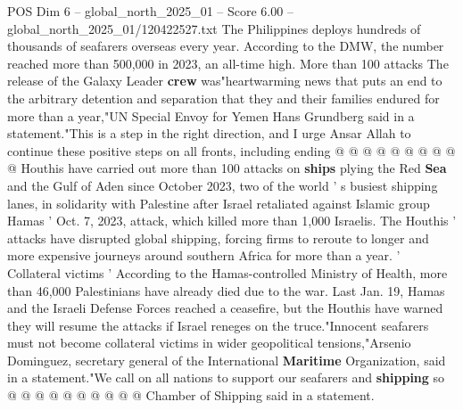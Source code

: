 \begin{textsample}{POS Dim 6 – global\_north\_2025\_01 – Score 6.00 – global\_north\_2025\_01/120422527.txt}
The Philippines deploys hundreds of thousands of seafarers overseas every year.
According to the DMW, the number reached more than 500,000 in 2023, an all-time high.
More than 100 attacks The release of the Galaxy Leader \textbf{crew} was"heartwarming news that puts an end to the arbitrary detention and separation that they and their families endured for more than a year,"UN Special Envoy for Yemen Hans Grundberg said in a statement."This is a step in the right direction, and I urge Ansar Allah to continue these positive steps on all fronts, including ending @ @ @ @ @ @ @ @ @ @ Houthis have carried out more than 100 attacks on \textbf{ships} plying the Red \textbf{Sea} and the Gulf of Aden since October 2023, two of the world ' s busiest shipping lanes, in solidarity with Palestine after Israel retaliated against Islamic group Hamas ' Oct. 7, 2023, attack, which killed more than 1,000 Israelis.
The Houthis ' attacks have disrupted global shipping, forcing firms to reroute to longer and more expensive journeys around southern Africa for more than a year. ' Collateral victims ' According to the Hamas-controlled Ministry of Health, more than 46,000 Palestinians have already died due to the war.
Last Jan. 19, Hamas and the Israeli Defense Forces reached a ceasefire, but the Houthis have warned they will resume the attacks if Israel reneges on the truce."Innocent seafarers must not become collateral victims in wider geopolitical tensions,"Arsenio Dominguez, secretary general of the International \textbf{Maritime} Organization, said in a statement."We call on all nations to support our seafarers and \textbf{shipping} so @ @ @ @ @ @ @ @ @ @ Chamber of Shipping said in a statement.

\end{textsample}
